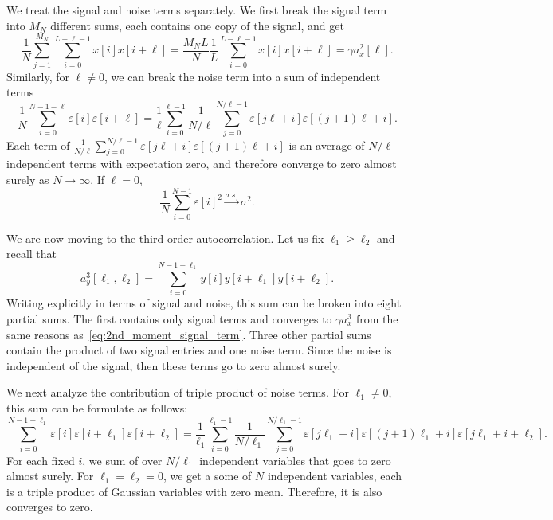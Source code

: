 \documentclass[english,11pt]{article}
\numberwithin{equation}{section}
\theoremstyle{plain}
\theoremstyle{definition}
\theoremstyle{remark}
\theoremstyle{plain}
\theoremstyle{remark}
\theoremstyle{plain}
\theoremstyle{plain}
\begin{document}
We treat the signal and noise terms separately. We first break the signal term into $M_N$ different sums, each contains one copy of the signal, and get
\begin{equation} \label{eq:2nd_moment_signal_term}
\frac{1}{N}\sum_{j=1}^{M_N}\sum_{i=0}^{L-\ell-1}x[i]x[i+\ell] = \frac{M_NL}{N}\frac{1}{L}\sum_{i=0}^{L-\ell-1}x[i]x[i+\ell] = \gamma a_x^2[\ell].
\end{equation}
Similarly, for $\ell\neq 0$, we can break the noise term into a sum of independent terms 
\begin{equation}
\frac{1}{N}\sum_{i=0}^{N-1-\ell} \varepsilon[i]\varepsilon[i+\ell] = \frac{1}{\ell}\sum_{i=0}^{\ell-1}\frac{1}{N/\ell}\sum_{j=0}^{N/\ell -1} \varepsilon[j\ell + i] \varepsilon[(j+1)\ell + i].
\end{equation}
Each term of $\frac{1}{N/\ell}\sum_{j=0}^{N/\ell -1} \varepsilon[j\ell + i] \varepsilon[(j+1)\ell + i]$ is an average of $N/\ell$ independent terms with expectation zero, and therefore converge to zero almost surely as $N\to\infty$.
If $\ell=0$, 
\begin{equation}
\frac{1}{N}\sum_{i=0}^{N-1} \varepsilon[i]^2 \xrightarrow{a.s.} \sigma^2.
\end{equation}

We are now moving to the third-order autocorrelation. Let us fix $\ell_1\geq\ell_2$ and recall that 
\begin{equation*}
a_y^3[\ell_1,\ell_2] = \sum_{i=0}^{N-1-\ell_1} y[i]y[i+\ell_1]y[i+\ell_2]. 
\end{equation*}
Writing explicitly in terms of signal and noise, this sum can be broken into eight partial sums. The first contains only signal terms and converges to $\gamma a_x^3$ from the same reasons as~\eqref{eq:2nd_moment_signal_term}. Three other partial sums contain the product of two signal entries and one noise term. Since the noise is independent of the signal, then these terms go to zero almost surely.

We next analyze the contribution of triple product of noise terms. For $\ell_1\neq 0$, this sum can be formulate as follows:
\begin{equation*}
\sum_{i=0}^{N-1-\ell_1} \varepsilon[i]\varepsilon[i+\ell_1]\varepsilon[i+\ell_2] = \frac{1}{\ell_1}\sum_{i=0}^{\ell_1-1}\frac{1}{N/\ell_1}\sum_{j=0}^{N/\ell_1 -1 }\varepsilon[j\ell_1+i]\varepsilon[(j+1)\ell_1+i]\varepsilon[j\ell_1+i+\ell_2].
\end{equation*}
For each fixed $i$, we sum of over $N/\ell_1$ independent variables that goes to zero almost surely. For $\ell_1=\ell_2=0$, we get a some of $N$ independent variables, each is a triple product of Gaussian variables with zero mean. Therefore, it is also converges to zero. 
\end{document}

